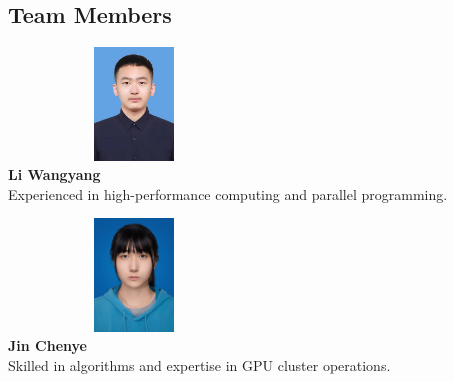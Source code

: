 \documentclass[a4paper,12pt]{article}
\begin{document}
\subsection{Team Members}
\begin{table}[H]
\centering
\begin{center}
    \begin{minipage}{0.45\textwidth}
        \centering
        \includegraphics[width=0.5\textwidth, height=3cm, keepaspectratio]{Li_Wangyang.png}\\[0.3cm]
        \textbf{Li Wangyang}\\[0.3cm]
        \small{Experienced in high-performance computing and parallel programming.}
    \end{minipage}
\begin{minipage}{0.45\textwidth}
    \centering
    \includegraphics[width=0.5\textwidth, height=3cm, keepaspectratio]{Jin_Chenye.png}\\[0.3cm]
    \textbf{Jin Chenye}\\[0.3cm]
    \small{Skilled in algorithms and expertise in GPU cluster operations.}
\end{minipage}

\vspace{1cm}


\end{center}
\end{table}
\end{document}
